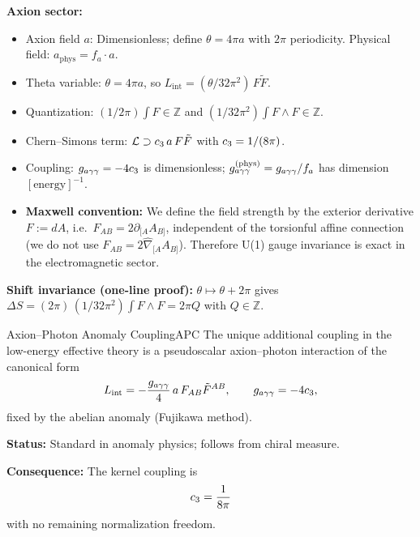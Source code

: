 \begin{tcolorbox}[colback=yellow!5, colframe=yellow!60!black, 
    title={\textbf{Conventions: Units, Masses, and Normalizations}}, fonttitle=\bfseries]
\textbf{Axion sector:}
\begin{itemize}[leftmargin=1.5em, topsep=2pt, itemsep=1pt]
    \item Axion field $a$: Dimensionless; define $\theta = 4\pi a$ with $2\pi$ periodicity. Physical field: $a_{\text{phys}} = f_a \cdot a$.
    \item Theta variable: $\theta = 4\pi a$, so $L_{\mathrm{int}} = (\theta/32\pi^2)\,F\tilde{F}$.
    \item Quantization: $(1/2\pi)\int F \in \mathbb{Z}$ and $(1/32\pi^2)\int F\wedge F \in \mathbb{Z}$.
    \item Chern--Simons term: $\mathcal{L} \supset c_3\, a\, F\tilde{F}$ with $c_3 = 1/(8\pi)$.
    \item Coupling: $g_{a\gamma\gamma} = -4c_3$ is dimensionless; $g_{a\gamma\gamma}^{\text{(phys)}} = g_{a\gamma\gamma} / f_a$ has dimension $[\text{energy}]^{-1}$.
    \item \textbf{Maxwell convention:} We define the field strength by the exterior derivative $F := dA$, i.e.\ $F_{AB}=2\partial_{[A}A_{B]}$, independent of the torsionful affine connection (we do not use $F_{AB}=2\hat{\nabla}_{[A}A_{B]}$). Therefore U(1) gauge invariance is exact in the electromagnetic sector.
\end{itemize}
\textbf{Shift invariance (one-line proof):} $\theta\mapsto \theta+2\pi$ gives $\Delta S=(2\pi)\,(1/32\pi^2)\int F\wedge F=2\pi Q$ with $Q\in\mathbb{Z}$.
\end{tcolorbox}

\begin{axiom}{Axion--Photon Anomaly Coupling}{APC}
The unique additional coupling in the low-energy effective theory is a 
pseudoscalar axion--photon interaction of the canonical form
\[
L_{\mathrm{int}}=-\frac{g_{a\gamma\gamma}}{4}\,a\,F_{AB}\tilde{F}^{AB},
\qquad g_{a\gamma\gamma}=-4c_3,
\]
fixed by the abelian anomaly (Fujikawa method).

\tcblower
\textbf{Status:} Standard in anomaly physics; follows from chiral measure.

\textbf{Consequence:} The kernel coupling is
\begin{equation}
    c_3 = \frac{1}{8\pi}
\end{equation}
with no remaining normalization freedom.
\end{axiom}

